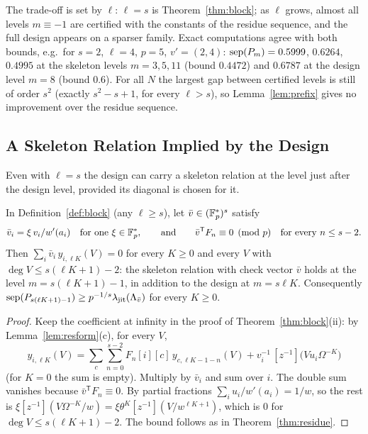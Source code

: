 The trade-off is set by $\ell$: $\ell=s$ is Theorem~\ref{thm:block}; as $\ell$ grows, almost all levels $m\equiv-1$ are certified with the constants of the residue sequence, and the full design appears on a sparser family. Exact computations agree with both bounds, e.g.\ for $s=2$, $\ell=4$, $p=5$, $v'=(2,4)$: $\operatorname{sep}(P_m)=0.5999$, $0.6264$, $0.4995$ at the skeleton levels $m=3,5,11$ (bound $0.4472$) and $0.6787$ at the design level $m=8$ (bound $0.6$). For all $N$ the largest gap between certified levels is still of order $s^2$ (exactly $s^2-s+1$, for every $\ell>s$), so Lemma~\ref{lem:prefix} gives no improvement over the residue sequence.

\subsection{A Skeleton Relation Implied by the Design}\label{sec:implied}
Even with $\ell=s$ the design can carry a skeleton relation at the level just after the design level, provided its diagonal is chosen for it.

\begin{proposition}\label{prop:implied}
In Definition~\ref{def:block} (any $\ell\ge s$), let $\bar v\in(\mathbb{F}_p^*)^s$ satisfy
\[
\bar v_i=\xi\,v_i/w'(a_i)\quad\text{for one }\xi\in\mathbb{F}_p^*,\qquad\text{and}\qquad \bar v^{\mathsf T}F_n\equiv0\pmod p\quad\text{for every }n\le s-2 .
\]
Then $\sum_i\bar v_i\,y_{i,\ell K}(V)=0$ for every $K\ge0$ and every $V$ with $\deg V\le s(\ell K+1)-2$: the skeleton relation with check vector $\bar v$ holds at the level $m=s(\ell K+1)-1$, in addition to the design at $m=s\ell K$. Consequently $\operatorname{sep}(P_{s(\ell K+1)-1})\ge p^{-1/s}\lambda_{\mathrm{jit}}(\Lambda_{\bar v})$ for every $K\ge0$.
\end{proposition}

\begin{proof}
Keep the coefficient at infinity in the proof of Theorem~\ref{thm:block}(ii): by Lemma~\ref{lem:resform}(c), for every $V$,
\[
y_{i,\ell K}(V)=\sum_c\sum_{n=0}^{s-2}F_n[i][c]\,y_{c,\ell K-1-n}(V)+v_i^{-1}\,[z^{-1}]\bigl(Vu_i\Omega^{-K}\bigr)
\]
(for $K=0$ the sum is empty). Multiply by $\bar v_i$ and sum over $i$. The double sum vanishes because $\bar v^{\mathsf T}F_n\equiv0$. By partial fractions $\sum_iu_i/w'(a_i)=1/w$, so the rest is $\xi[z^{-1}](V\Omega^{-K}/w)=\xi\theta^K[z^{-1}](V/w^{\ell K+1})$, which is $0$ for $\deg V\le s(\ell K+1)-2$. The bound follows as in Theorem~\ref{thm:residue}.
\end{proof}

